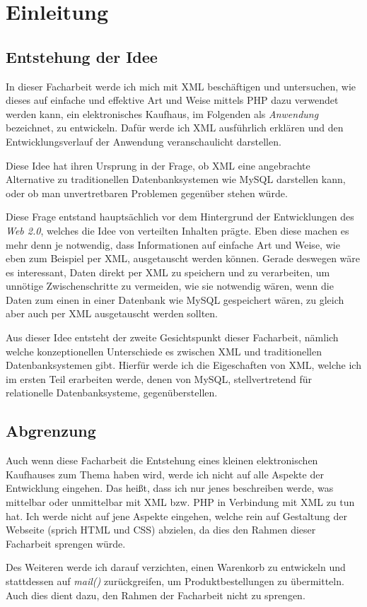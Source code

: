 

\chapter{Einleitung}
\section{Entstehung der Idee}
In dieser Facharbeit werde ich mich mit XML beschäftigen und
untersuchen, wie dieses auf einfache und effektive Art und Weise
mittels PHP dazu verwendet werden kann, ein elektronisches Kaufhaus,
im Folgenden als {\em Anwendung} bezeichnet, zu entwickeln. Dafür werde
ich XML ausführlich erklären und den Entwicklungsverlauf der Anwendung
veranschaulicht darstellen.

Diese Idee hat ihren Ursprung in der Frage, ob XML eine angebrachte
Alternative zu traditionellen Datenbanksystemen wie MySQL darstellen
kann, oder ob man unvertretbaren Problemen gegenüber stehen würde.

Diese Frage entstand hauptsächlich vor dem Hintergrund der
Entwicklungen des {\em Web 2.0}, welches die Idee von verteilten
Inhalten prägte. Eben diese machen es mehr denn je notwendig, dass
Informationen auf einfache Art und Weise, wie eben zum Beispiel per XML,
ausgetauscht werden können. Gerade deswegen wäre es interessant, Daten
direkt per XML zu speichern und zu verarbeiten, um unnötige
Zwischenschritte zu vermeiden, wie sie notwendig wären, wenn die Daten
zum einen in einer Datenbank wie MySQL gespeichert wären, zu gleich
aber auch per XML ausgetauscht werden sollten.

Aus dieser Idee entsteht der zweite Gesichtspunkt dieser Facharbeit,
nämlich welche konzeptionellen Unterschiede es zwischen XML und
traditionellen Datenbanksystemen gibt. Hierfür werde ich die
Eigeschaften von XML, welche ich im ersten Teil erarbeiten werde,
denen von MySQL, stellvertretend für relationelle Datenbanksysteme,
gegenüberstellen.

\section{Abgrenzung}
Auch wenn diese Facharbeit die Entstehung eines kleinen elektronischen
Kaufhauses zum Thema haben wird, werde ich nicht auf alle Aspekte der
Entwicklung eingehen. Das heißt, dass ich nur jenes beschreiben werde,
was mittelbar oder unmittelbar mit XML bzw. PHP in Verbindung mit XML
zu tun hat. Ich werde nicht auf jene Aspekte eingehen, welche rein auf
Gestaltung der Webseite (sprich HTML und CSS) abzielen, da dies den
Rahmen dieser Facharbeit sprengen würde.

Des Weiteren werde ich darauf verzichten, einen Warenkorb zu
entwickeln und stattdessen auf {\em mail()} zurückgreifen, um
Produktbestellungen zu übermitteln. Auch dies dient dazu, den Rahmen
der Facharbeit nicht zu sprengen.

